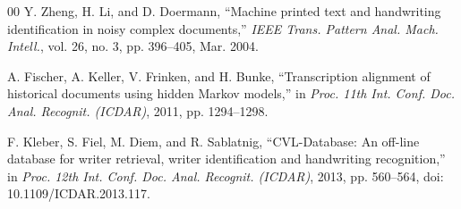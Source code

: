 \documentclass{IEEEtran}
\begin{document}
\begin{thebibliography}{00}
 Y. Zheng, H. Li, and D. Doermann, ``Machine printed text and handwriting identification in noisy complex documents,'' \emph{IEEE Trans. Pattern Anal. Mach. Intell.}, vol. 26, no. 3, pp. 396--405, Mar. 2004.

 A. Fischer, A. Keller, V. Frinken, and H. Bunke, ``Transcription alignment of historical documents using hidden Markov models,'' in \emph{Proc. 11th Int. Conf. Doc. Anal. Recognit. (ICDAR)}, 2011, pp. 1294--1298.

 F. Kleber, S. Fiel, M. Diem, and R. Sablatnig, ``CVL-Database: An off-line database for writer retrieval, writer identification and handwriting recognition,'' in \emph{Proc. 12th Int. Conf. Doc. Anal. Recognit. (ICDAR)}, 2013, pp. 560--564, doi: 10.1109/ICDAR.2013.117.

\end{thebibliography}
\end{document}
